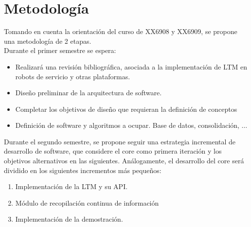 \documentclass[12pt,letterpaper,spanish]{article}
\begin{document}


\section{Metodolog\'ia}

Tomando en cuenta la orientaci\'on del curso de XX6908 y XX6909, se propone una metodolog\'ia de 2 etapas.\\

Durante el primer semestre se espera:
\begin{itemize}
\item Realizar\'a una revisi\'on bibliogr\'afica, asociada a la implementaci\'on de LTM en robots de servicio y otras plataformas.
\item Dise\~no preliminar de la arquitectura de software.
\item Completar los objetivos de dise\~no que requieran la definici\'on de conceptos
\item Definici\'on de software y algoritmos a ocupar. Base de datos, consolidaci\'on, $\ldots$
\end{itemize}

Durante el segundo semestre, se propone seguir una estrategia incremental de desarrollo de software, que considere el core como primera iteraci\'on y los objetivos alternativos en las siguientes. An\'alogamente, el desarrollo del core ser\'a dividido en los siguientes incrementos m\'as peque\~nos:
\begin{enumerate}
\item Implementaci\'on de la LTM y su API.
\item M\'odulo de recopilaci\'on continua de informaci\'on
\item Implementaci\'on de la demostraci\'on.
\end{enumerate}
 


\end{document}
